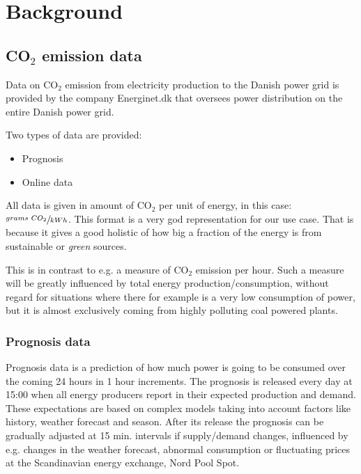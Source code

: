 \documentclass[Main]{subfiles}
\begin{document}
\section{Background} %
\label{sec:background}

	\subsection{CO$_2$ emission data} %
	\label{sub:c02_emission_data}

		Data on CO$_2$ emission from electricity production to the Danish power grid is provided by the company Energinet.dk that oversees power distribution on the entire Danish power grid.

		Two types of data are provided:
		\begin{itemize}
			\item Prognosis
			\item Online data
		\end{itemize}

		All data is given in amount of CO$_2$ per unit of energy, in this case: 
		$\sfrac{grams\ CO_2}{kWh}$.
		This format is a very god representation for our use case.
		That is because it gives a good holistic of how big a fraction of the energy is from sustainable or \emph{green} sources.
		
		This is in contrast to e.g. a measure of CO$_2$ emission per hour.
		Such a measure will be greatly influenced by total energy production/consumption, without regard for situations where there for example is a very low consumption of power, but it is almost exclusively coming from highly polluting coal powered plants.

		\subsubsection{Prognosis data} %
		\label{sub:prognosis}
			Prognosis data is a prediction of how much power is going to be consumed over the coming 24 hours in 1 hour increments.
			The prognosis is released every day at 15:00 when all energy producers report in their expected production and demand.
			These expectations are based on complex models taking into account factors like history, weather forecast and season.
			After its release the prognosis can be gradually adjusted at 15 min. intervals if supply/demand changes, influenced by e.g. changes in the weather forecast, abnormal consumption or fluctuating prices at the Scandinavian energy exchange, Nord Pool Spot.
\end{document}
